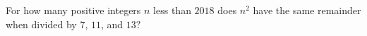 For how many positive integers $n$ less than $2018$ does $n^2$ have the same remainder when divided by $7$,  $11$,  and $13?$